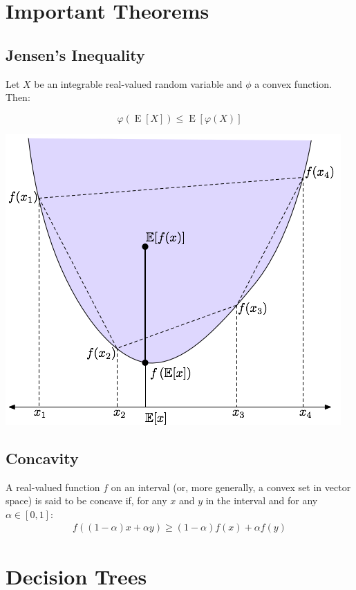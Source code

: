 \documentclass[8pt, a4paper, landscape, includeheadfoot]{extarticle}
\begin{document}
\begin{multicols*}{4}
	\section{Important Theorems}

	\subsection{Jensen's Inequality}

	Let $X$ be an integrable real-valued random variable and $\phi$ a convex function. Then:

	$$\varphi\left(\operatorname{E}[X]\right) \leq \operatorname{E} \left[ \varphi(X) \right]$$
	\begin{center}
		\includegraphics[width=0.8\linewidth]{0_images/jensen.png}
	\end{center}

	\subsection{Concavity}
	A real-valued function $f$	 on an interval (or, more generally, a convex set in vector space) is said to be concave if, for any $x$ and $y$ in the interval and for any $\alpha\in[0,1]$:
	\begin{align*}
		f((1-\alpha )x+\alpha y)\geq (1-\alpha ) f(x)+\alpha f(y)
	\end{align*}

	\section{Decision Trees}

\end{multicols*}
\end{document}
